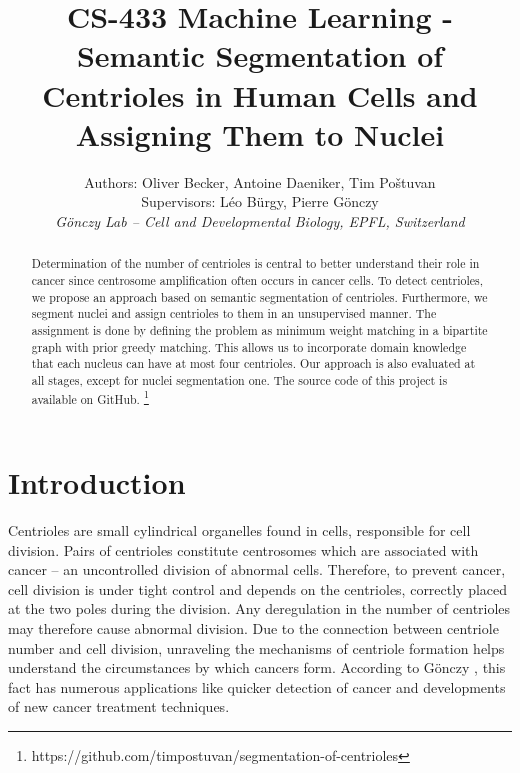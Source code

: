 \documentclass[9pt,conference,compsocconf, article]{IEEEtran}
\begin{document}
\title{CS-433 Machine Learning - Semantic Segmentation of Centrioles in Human Cells and Assigning Them to Nuclei}


\author{
Authors: Oliver Becker, Antoine Daeniker, Tim Poštuvan\\
Supervisors: Léo Bürgy, Pierre Gönczy \\
\textit{Gönczy Lab -- Cell and Developmental Biology, EPFL, Switzerland}}


\maketitle

\begin{abstract} 

Determination of the number of centrioles is central to better understand their role in cancer since centrosome amplification often occurs in cancer cells. To detect centrioles, we propose an approach based on semantic segmentation of centrioles. Furthermore, we segment nuclei and assign centrioles to them in an unsupervised manner. The assignment is done by defining the problem as minimum weight matching in a bipartite graph with prior greedy matching. This allows us to incorporate domain knowledge that each nucleus can have at most four centrioles. Our approach is also evaluated at all stages, except for nuclei segmentation one. The source code of this project is available on GitHub. \footnote{https://github.com/timpostuvan/segmentation-of-centrioles}



\end{abstract}

\section{Introduction}

Centrioles are small cylindrical organelles found in cells, responsible for cell division. Pairs of centrioles constitute centrosomes which are associated with cancer -- an uncontrolled division of abnormal cells. Therefore, to prevent cancer, cell division is under tight control and depends on the centrioles, correctly placed at the two poles during the division. Any deregulation in the number of centrioles may therefore cause abnormal division. Due to the connection between centriole number and cell division, unraveling the mechanisms of centriole formation helps understand the circumstances by which cancers form. According to Gönczy \cite{gonczy2015centrosomes}, this fact has numerous applications like quicker detection of cancer and developments of new cancer treatment techniques.
\end{document}
